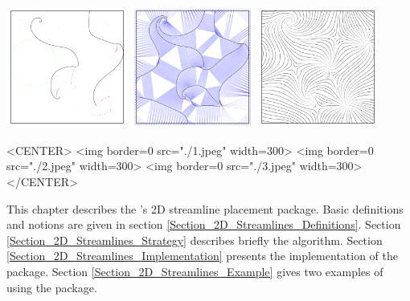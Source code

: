 \newcommand{\streamlinecomment}[1]{}


\begin{ccTexOnly}
\begin{center}
\includegraphics[width=4cm]{Stream_lines_2/1} \hspace*{0.5cm} 
\includegraphics[width=4cm]{Stream_lines_2/2} \hspace*{0.5cm} 
\includegraphics[width=4cm]{Stream_lines_2/3} 
\end{center}
\end{ccTexOnly}

\begin{ccHtmlOnly}
<CENTER>
<img border=0 src="./1.jpeg" width=300>
<img border=0 src="./2.jpeg" width=300>
<img border=0 src="./3.jpeg" width=300>
</CENTER>
\end{ccHtmlOnly}

This chapter describes the \cgal's 2D streamline placement package.
Basic definitions and notions are given in section
\ref{Section_2D_Streamlines_Definitions}. Section
\ref{Section_2D_Streamlines_Strategy} describes briefly the algorithm. Section
\ref{Section_2D_Streamlines_Implementation} presents the implementation of the package. Section
\ref{Section_2D_Streamlines_Example} gives two examples of using the package.

